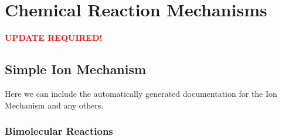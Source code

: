 \chapter{Chemical Reaction Mechanisms}

\textcolor{red}{\textbf{UPDATE REQUIRED!}}


\section{Simple Ion Mechanism}

Here we can include the automatically generated documentation for the Ion Mechanism and any others.

\subsection{Bimolecular Reactions}

